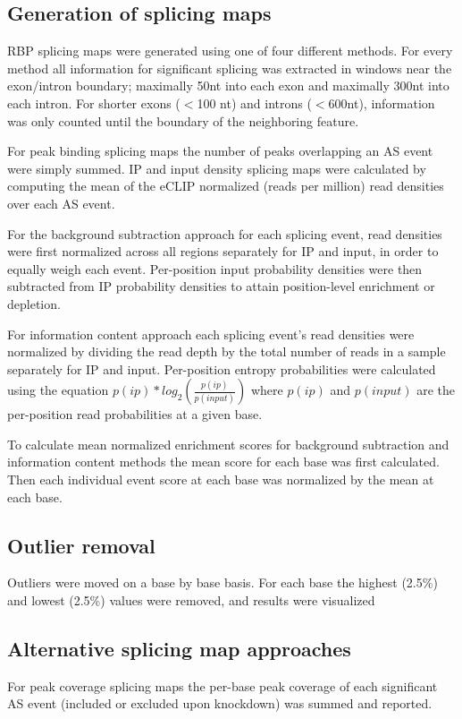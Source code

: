 \subsection{Generation of splicing maps}
RBP splicing maps were generated using one of four different methods.  For every method all information for significant splicing was extracted in windows near the exon/intron boundary; maximally 50nt into each exon and maximally 300nt into each intron. For shorter exons ($<$100 nt) and introns ($<$600nt), information was only counted until the boundary of the neighboring feature.

For peak binding splicing maps the number of peaks overlapping an AS event were simply summed. IP and input density splicing maps were calculated by computing the mean of the eCLIP normalized (reads per million) read densities over each AS event.

For the background subtraction approach for each splicing event, read densities were first normalized across all regions separately for IP and input, in order to equally weigh each event. Per-position input probability densities were then subtracted from IP probability densities to attain position-level enrichment or depletion.

For information content approach each splicing event’s read densities were normalized by dividing the read depth by the total number of reads in a sample separately for IP and input. Per-position entropy probabilities were calculated using the equation $p(ip) * log_2(\frac{p(ip)}{p(input)})$ where $p(ip)$ and $p(input)$ are the per-position read probabilities at a given base.

To calculate mean normalized enrichment scores for background subtraction and information content methods the mean score for each base was first calculated.  Then each individual event score at each base was normalized by the mean at each base.

\subsection{Outlier removal}
Outliers were moved on a base by base basis. For each base the highest (2.5\%) and lowest (2.5\%) values were removed, and results were visualized

\subsection{Alternative splicing map approaches}
For peak coverage splicing maps the per-base peak coverage of each significant AS event (included or excluded upon knockdown) was summed and reported.

